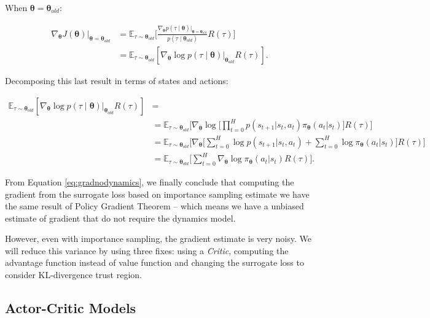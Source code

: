 When $\boldsymbol{\theta} = \boldsymbol{\theta}_{old}$:

\begin{align}
\nabla_{\boldsymbol{\theta}} J(\boldsymbol{\theta}) |_{\boldsymbol{\theta} = \boldsymbol{\theta}_{old}} &= \mathbb{E}_{\tau \sim \boldsymbol{\theta}_{old}} \Bigg[\frac{\nabla_{\boldsymbol{\theta}} p(\tau \mid \boldsymbol{\theta})|_{\boldsymbol{\theta} = \boldsymbol{\theta}_{old}}}{p(\tau \mid \boldsymbol{\theta}_{old})}R(\tau) \Bigg] \\
&= \mathbb{E}_{\tau \sim \boldsymbol{\theta}_{old}} [\nabla_{\boldsymbol{\theta}} \log p(\tau \mid \boldsymbol{\theta} ) |_{\boldsymbol{\theta}_{old}}R(\tau)].
\end{align} 

Decomposing this last result in terms of states and actions:

\begin{align}
\mathbb{E}_{\tau \sim \boldsymbol{\theta}_{old}} [\nabla_{\boldsymbol{\theta}} \log p(\tau \mid \boldsymbol{\theta} ) |_{\boldsymbol{\theta}_{old}}R(\tau)] &= \\
&=  \mathbb{E}_{\tau \sim \boldsymbol{\theta}_{old}} \Bigg[\nabla_{\boldsymbol{\theta}} \log \Big[ \prod_{t = 0}^{H}p(s_{t+1}|s_{t}, a_{t})\pi_{\boldsymbol{\theta}}(a_{t}|s_{t})\Big] R(\tau) \Bigg] \\
&= \mathbb{E}_{\tau \sim \boldsymbol{\theta}_{old}} \Bigg[ \nabla_{\boldsymbol{\theta}} \Big[ \sum_{t=0}^{H} \log p(s_{t+1}|s_{t}, a_{t}) + \sum_{t = 0}^{H} \log \pi_{\boldsymbol{\theta}}(a_{t}|s_{t}) \Big] R(\tau) \Bigg] \\
&= \mathbb{E}_{\tau \sim \boldsymbol{\theta}_{old}} \Bigg[ \sum_{t=0}^{H} \nabla_{\boldsymbol{\theta}} \log \pi_{\boldsymbol{\theta}} (a_{t}|s_{t}) R(\tau) \Bigg]. \label{eq:gradnodynamics}
\end{align}

From Equation \eqref{eq:gradnodynamics}, we finally conclude that computing the gradient from the surrogate loss based on importance sampling estimate we have the same result of Policy Gradient Theorem -- which means we have a unbiased estimate of gradient that do not require the dynamics model.

However, even with importance sampling, the gradient estimate is very noisy. We will reduce this variance by using three fixes: using a \textit{Critic}, computing the advantage function instead of value function and changing the surrogate loss to consider KL-divergence trust region. 

\subsection{Actor-Critic Models}


